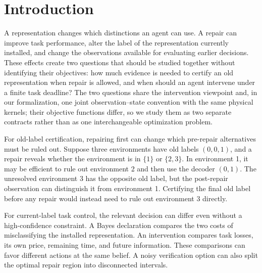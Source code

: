 \section{Introduction}
A representation changes which distinctions an agent can use. A repair can
improve task performance, alter the label of the representation currently
installed, and change the observations available for evaluating earlier
decisions. These effects create two questions that should be studied together
without identifying their objectives: how much evidence is needed to certify
an old representation when repair is allowed, and when should an agent
intervene under a finite task deadline? The two questions share the
intervention viewpoint and, in our formalization, one joint observation--state
convention with the same physical kernels; their objective functions differ,
so we study them as two separate contracts rather than as one interchangeable
optimization problem.

For old-label certification, repairing first can change which pre-repair
alternatives must be ruled out. Suppose three environments have old labels
$(0,0,1)$, and a repair reveals whether the environment is in $\{1\}$ or
$\{2,3\}$. In environment 1, it may be efficient to rule out environment 2
and then use the decoder $(0,1)$. The unresolved environment 3 has the
opposite old label, but the post-repair observation can distinguish it from
environment 1. Certifying the final old label before any repair would instead
need to rule out environment 3 directly.

For current-label task control, the relevant decision can differ even without
a high-confidence constraint. A Bayes declaration compares the two costs of
misclassifying the installed representation. An intervention compares task
losses, its own price, remaining time, and future information. These comparisons
can favor different actions at the same belief. A noisy verification option can
also split the optimal repair region into disconnected intervals.

